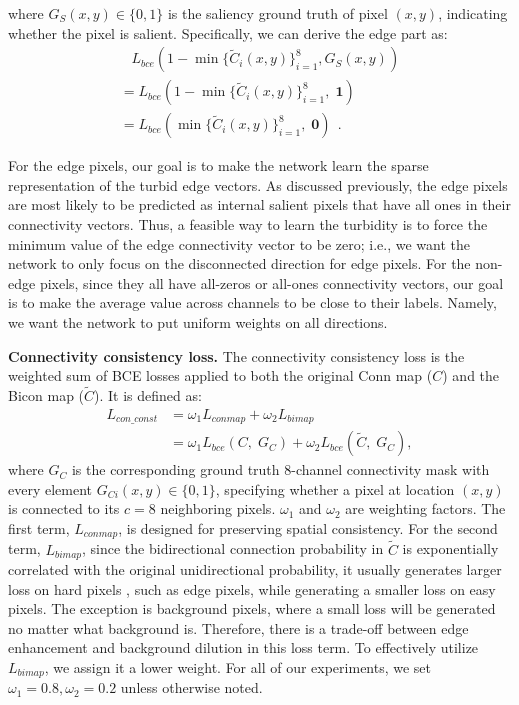 \documentclass[review]{cvpr}
\begin{document}
where  $G_S(x,y)\in \{0,1\}$ is the saliency ground truth of pixel $(x,y)$, indicating whether the pixel is salient. Specifically, we can derive the edge part as: 
\begin{equation}
{
\begin{array}{l}
\;\;\;{L_{bce}}(1 - \min \{ {\widetilde C_i}(x,y)\} _{i = 1}^8,{G_S}(x,y))\\
 = {L_{bce}}(1 - \min \{ {\widetilde C_i}(x,y)\} _{i = 1}^8,\;{\textbf{1}})\\ 
 = {L_{bce}}(\min \{ {\widetilde C_i}(x,y)\} _{i = 1}^8,\;{\textbf{0}})\ \ .
\end{array}}
\end{equation}

For the edge pixels, our goal is to make the network learn the sparse representation of the turbid edge vectors. As discussed previously, the edge pixels are most likely to be predicted as internal salient pixels that have all ones in their connectivity vectors. Thus, a feasible way to learn the turbidity is to force the minimum value of the edge connectivity vector to be zero; i.e., we want the network to only focus on the disconnected direction for edge pixels. For the non-edge pixels, since they all have all-zeros or all-ones connectivity vectors, our goal is to make the average value across channels to be close to their labels. Namely, we want the network to put uniform weights on all directions.

\textbf{Connectivity consistency loss.} The connectivity consistency loss is the weighted sum of BCE losses applied to both the original Conn map ($C$) and the Bicon map ($\widetilde{C}$). It is defined as:
\begin{equation}
{
\begin{aligned}
{L_{con\_const}} &= {\omega _1}{L_{conmap}} + {\omega _2}{L_{bimap}}\\
 &= {\omega _1}{L_{bce}}(C,\;{G_C}) + {\omega _2}{L_{bce}}(\widetilde C,\;{G_C}),
\end{aligned}}
\end{equation}
where $G_C$ is the corresponding ground truth 8-channel connectivity mask with every element $G_{Ci}(x,y) \in \{ 0,1\}$, specifying whether a pixel at location $(x,y)$ is connected to its $c = 8$ neighboring pixels. $\omega _1$ and $\omega _2$ are weighting factors. The first term, $L_{conmap}$, is designed for preserving spatial consistency. For the second term, $L_{bimap}$, since the bidirectional connection probability in $\widetilde{C}$ is exponentially correlated with the original unidirectional probability, it usually generates larger loss on hard pixels \cite{f3net}, such as edge pixels, while generating a smaller loss on easy pixels. The exception is background pixels, where a small loss will be generated no matter what background is. Therefore, there is a trade-off between edge enhancement and background dilution in this loss term. To effectively utilize $L_{bimap}$, we assign it a lower weight. For all of our experiments, we set $\omega_1=0.8,\omega_2=0.2$ unless otherwise noted.
\end{document}
